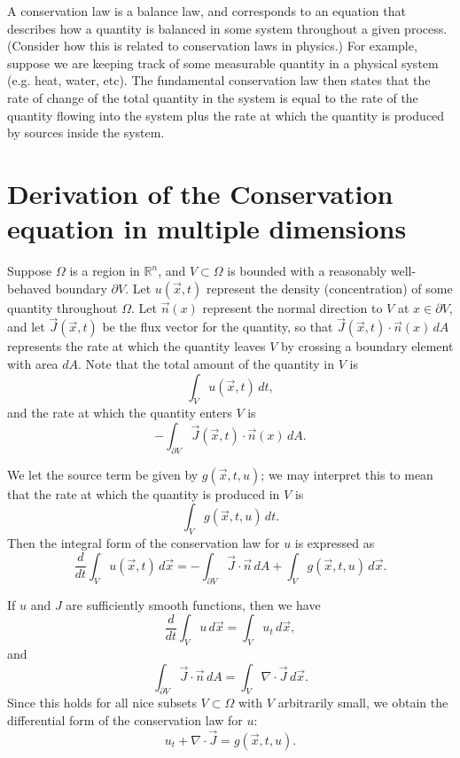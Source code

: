 \label{lab:finitedifference1}

A conservation law is a balance law, and corresponds to an equation that describes how a quantity is balanced in some system throughout a given process.
(Consider how this is related to conservation laws in physics.)
For example, suppose we are keeping track of some measurable quantity in a physical system (e.g. heat, water, etc).
The fundamental conservation law then states that the rate of change of the total quantity in the system is equal to the rate of the quantity flowing into the system plus the rate at which the quantity is produced by sources inside the system.

\section*{Derivation of the Conservation equation in multiple dimensions}
Suppose $\Omega$ is a region in $\mathbb{R}^n$, and $V \subset \Omega$ is bounded with a reasonably well-behaved boundary $\partial V$.
Let $u(\vec{x},t)$ represent the density (concentration) of some quantity throughout $\Omega$.
Let $\vec{n}(x)$ represent the normal direction to $V$ at $x \in \partial V$, and let $\vec{J}(\vec{x},t)$ be the flux vector for the quantity, so that $\vec{J}(\vec{x},t) \cdot \vec{n}(x) \, dA$ represents the rate at which the quantity leaves $V$ by crossing a boundary element with area $dA$.
Note that the total amount of the quantity in $V$ is
\[ \int_V u(\vec{x},t)\, dt,\]
and the rate at which the quantity enters $V$ is
\[-\int_{\partial V} \vec{J}(\vec{x},t) \cdot \vec{n}(x) \, dA.\]

We let the source term be given by $g(\vec{x},t,u)$; we may interpret this to mean that the rate at which the quantity is produced in $V$ is
\[\int_V g(\vec{x},t,u)\, dt.\]
Then the integral form of the conservation law for $u$ is expressed as
\[\frac{d}{dt} \int_V u(\vec{x},t) \, d\vec{x} = -\int_{\partial V} \vec{J}\cdot \vec{n}\, dA + \int_V g(\vec{x},t,u)\, d\vec{x}.\]

If $u$ and $J$ are sufficiently smooth functions, then we have
\[ \frac{d}{dt} \int_V u\, d\vec{x} = \int_V u_t \, d\vec{x},\]
and
\[ \int_{\partial V} \vec{J}\cdot \vec{n}\, dA = \int_V \nabla \cdot \vec{J}\, d\vec{x} .\]
Since this holds for all nice subsets $V \subset \Omega$ with $V$ arbitrarily small, we obtain the differential form of the conservation law for $u$:
\[ u_t + \nabla \cdot \vec{J} = g(\vec{x},t,u) .\]

